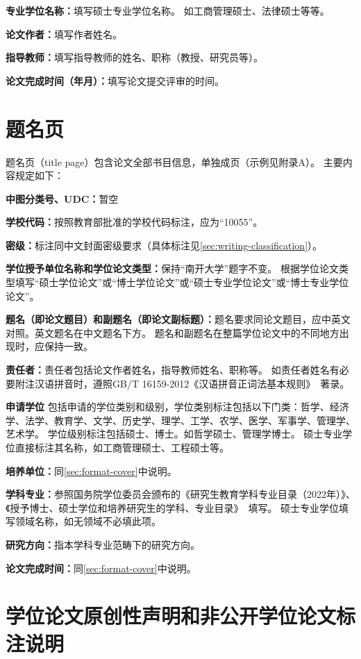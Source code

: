 \textbf{专业学位名称：}填写硕士专业学位名称。
如工商管理硕士、法律硕士等等。

\textbf{论文作者：}填写作者姓名。

\textbf{指导教师：}填写指导教师的姓名、职称（教授、研究员等）。

\textbf{论文完成时间（年月）：}填写论文提交评审的时间。

\section{题名页}

题名页（title page）包含论文全部书目信息，单独成页（示例见附录A）。
主要内容规定如下：

\textbf{中图分类号、UDC：}暂空

\textbf{学校代码：}按照教育部批准的学校代码标注，应为“10055”。

\textbf{密级：}标注同中文封面密级要求（具体标注见\ref{sec:writing-classification}）。

\textbf{学位授予单位名称和学位论文类型：}保持“南开大学”题字不变。
根据学位论文类型填写“硕士学位论文”或“博士学位论文”或“硕士专业学位论文”或“博士专业学位论文”。

\textbf{题名（即论文题目）和副题名（即论文副标题）：}题名要求同论文题目，应中英文对照。英文题名在中文题名下方。
题名和副题名在整篇学位论文中的不同地方出现时，应保持一致。

\textbf{责任者：}责任者包括论文作者姓名，指导教师姓名、职称等。
如责任者姓名有必要附注汉语拼音时，遵照GB/T 16159-2012《汉语拼音正词法基本规则》~\cite{SCSF00038519}著录。

\textbf{申请学位}
包括申请的学位类别和级别，学位类别标注包括以下门类：哲学、经济学、法学、教育学、文学、历史学、理学、工学、农学、医学、军事学、管理学、艺术学。
学位级别标注包括硕士、博士。如哲学硕士、管理学博士。
硕士专业学位直接标注其名称，如工商管理硕士、工程硕士等。

\textbf{培养单位：}同\ref{sec:format-cover}中说明。

\textbf{学科专业：}参照国务院学位委员会颁布的《研究生教育学科专业目录（2022年）》、《授予博士、硕士学位和培养研究生的学科、专业目录》~\cite{REF00000002}填写。
硕士专业学位填写领域名称，如无领域不必填此项。

\textbf{研究方向：}指本学科专业范畴下的研究方向。

\textbf{论文完成时间：}同\ref{sec:format-cover}中说明。

\section{学位论文原创性声明和非公开学位论文标注说明}

